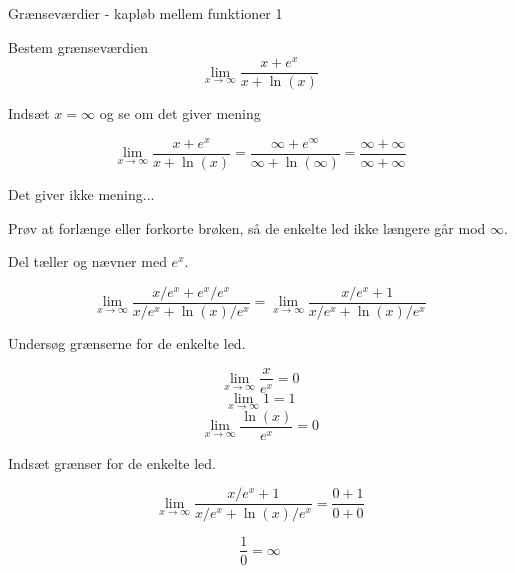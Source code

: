 \documentclass{article}
\begin{document}
\tableofcontents
\newpage

\begin{exercise}{Grænseværdier - kapløb mellem funktioner 1}

Bestem grænseværdien 
\[
\lim_{x \to \infty} \frac{x + e^x}{x + \ln(x)}
\]


\hint
Indsæt $x=\infty$ og se om det giver mening

\hint
\[
\lim_{x \to \infty} \frac{x + e^x}{x + \ln(x)} = \frac{\infty + e^\infty}{\infty + \ln(\infty)} = \frac{\infty + \infty}{\infty + \infty}
\]

\hint
Det giver ikke mening...

\hint
Prøv at forlænge eller forkorte brøken, så de enkelte led ikke længere går mod $\infty$. 

\hint
Del tæller og nævner med $e^x$. 

\hint
\[
 \lim_{x \to \infty} \frac{x/e^x + e^x/e^x}{x/e^x + \ln(x)/e^x} = \lim_{x \to \infty} \frac{x/e^x + 1}{x/e^x + \ln(x)/e^x}
\]

\hint
Undersøg grænserne for de enkelte led.

\hint
\[
\lim_{x \to \infty} \frac{x}{e^x} = 0
\]
\[
\lim_{x \to \infty} 1 = 1
\]
\[
\lim_{x \to \infty} \frac{\ln(x)}{e^x} = 0
\]

\hint 
Indsæt grænser for de enkelte led.

\hint
\[
\lim_{x \to \infty} \frac{x/e^x + 1}{x/e^x + \ln(x)/e^x} = \frac{0 + 1}{0+0}
\]

\hint
\[
\frac{1}{0} = \infty
\]

\end{exercise}
\newpage
\end{document}
